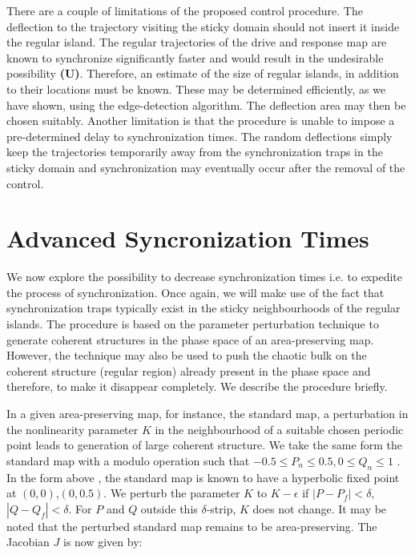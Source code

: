 \documentclass[preprint,showpacs,preprintnumbers,amsmath,amssymb]{revtex4-1}
\begin{document}
There are a couple of limitations of the proposed control procedure. The deflection to the trajectory visiting the sticky domain should not insert it inside the regular island. The regular trajectories of the drive and response map are known to synchronize significantly faster and would result in the undesirable possibility \textbf{(U)}. Therefore, an estimate of the size of regular islands, in addition to their locations must be known. These may be determined efficiently, as we have shown, using the edge-detection algorithm. The deflection area  may then be chosen suitably.  Another limitation is that the procedure is unable to impose a pre-determined delay to synchronization times. The random deflections simply keep the trajectories temporarily away from the synchronization traps in the sticky domain and synchronization may eventually occur after the removal of the control. 

 
 \section{Advanced Syncronization Times}
 \label{sec:advanced}
 We now explore the possibility to decrease synchronization times i.e. to expedite the process of synchronization. Once again, we will make use of the fact that synchronization traps typically exist in the sticky neighbourhoods of the regular islands.  The procedure is based on the parameter perturbation technique to generate coherent structures in the phase space of an area-preserving map. However, the technique may also be used to push the chaotic bulk on the coherent structure (regular region) already present in the phase space and therefore, to make it disappear completely.  We describe the procedure briefly. 
 
 In a given area-preserving map, for instance, the  standard map, a  perturbation in the nonlinearity parameter $K$ in the neighbourhood of a suitable chosen periodic point leads to generation of large coherent structure.   We take the same form the standard map with a modulo operation such that $-0.5 \leq P_n \leq 0.5, 0\leq Q_n \leq 1$ . In the form above \cite{FN1}, the standard map is known to have a hyperbolic fixed point at $(0,0)$,$(0,0.5)$. We perturb the parameter $K$ to $K-\epsilon$ if $|P - P_f| < \delta$, $|Q-Q_f| < \delta$. For $P$ and $Q$ outside this $\delta$-strip, $K$ does not change.  It may be noted that the perturbed standard map remains to be area-preserving. The Jacobian $J$ is now given by: 
 
\end{document}
